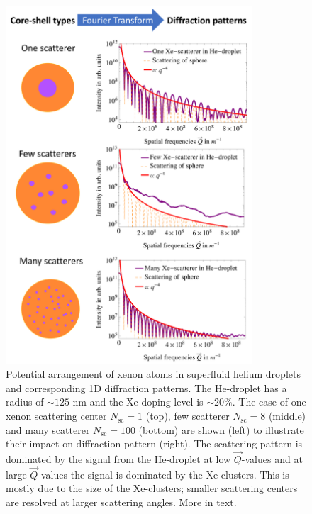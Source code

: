 \begin{figure}
 	\centering
 		\includegraphics[width=0.82\textwidth]{images/results/plum-pudding.png}
 	\caption[Potential arrangement of Xe-clusters within He-droplets.]{Potential arrangement of xenon atoms in superfluid helium droplets and corresponding 1D diffraction patterns. The He-droplet has a radius of $\sim 125$ nm and the Xe-doping level is $\sim 20\%$. The case of one xenon scattering center $N_{\text{sc}}=1$ (top), few scatterer $N_{\text{sc}}=8$ (middle) and many scatterer $N_{\text{sc}}=100$ (bottom) are shown (left) to illustrate their impact on diffraction pattern (right). The scattering pattern is dominated by the signal from the He-droplet at low $\vec{Q}$-values and at large $\vec{Q}$-values the signal is dominated by the Xe-clusters. This is mostly due to the size of the Xe-clusters; smaller scattering centers are resolved at larger scattering angles. More in text.}
 	\label{fig:HeXe-plum-pudding}
\end{figure}
